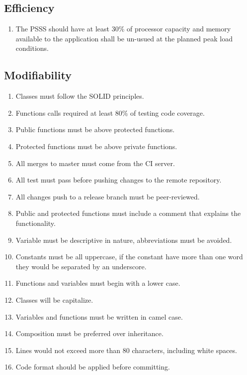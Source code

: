 \subsection{Efficiency}
\begin{enumerate}[label=EFF-\arabic*]
    \item The PSSS should have at least 30\% of processor capacity and memory 
    available to the application shall be un-usued at the planned 
    peak load conditions.
\end{enumerate}

\pagebreak

\subsection{Modifiability}
\begin{enumerate}[label=MOD-\arabic*]
    \item Classes must follow the SOLID principles. \cite{solid}
    \item Functions calls required at least 80\% of testing code coverage.
    \item Public functions must be above protected functions.
    \item Protected functions must be above private functions.
    \item All merges to master must come from the CI server.
    \item All test must pass before pushing changes to the remote repository.
    \item All changes push to a release branch must be peer-reviewed.
    \item Public and protected functions must include a comment that explains 
    the functionality.
    \item Variable must be descriptive in nature, abbreviations must be 
    avoided.
    \item Constants must be all uppercase, if the constant have more than one 
    word they would be separated by an underscore.
    \item Functions and variables must begin with a lower case.
    \item Classes will be capitalize.
    \item Variables and functions must be written in camel case.
    \item Composition must be preferred over inheritance.
    \item Lines would not exceed more than 80 characters, including white 
    spaces.
    \item Code format should be applied before committing.
\end{enumerate}

